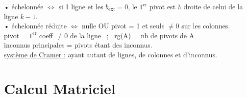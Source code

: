 \documentclass[12 pt]{exampleclass}
\begin{document}
\begin{flushleft}
\begin{doublespace}

	• échelonnée $\Leftrightarrow$ si 1 ligne et les $b_{\text{ext}} =0$, le $1^{\text{er}}$ pivot est à droite de celui de la ligne $k-1$.\\
	• échelonnée réduite $\Leftrightarrow$ nulle OU pivot = 1 et seuls $\ne 0$ sur les colonnes.\\
	pivot = $1^{\text{er}}$ coeff $\ne 0$ de la ligne \ ; \ rg(A) = nb de pivots de A \\
	 inconnus principales = pivots étant des inconnus.\\ 
	 \underline{système de Cramer :} ayant autant de lignes, de colonnes et d'inconnus.\\


\end{doublespace}
\end{flushleft}

\section{Calcul Matriciel}
\end{document}
